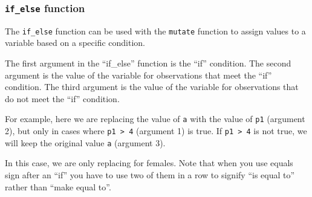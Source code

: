 \documentclass[]{book}
\newenvironment{Shaded}{\begin{snugshade}}{\end{snugshade}}
\newcommand{\DataTypeTok}[1]{\textcolor[rgb]{0.13,0.29,0.53}{#1}}
\newcommand{\DecValTok}[1]{\textcolor[rgb]{0.00,0.00,0.81}{#1}}
\newcommand{\KeywordTok}[1]{\textcolor[rgb]{0.13,0.29,0.53}{\textbf{#1}}}
\newcommand{\NormalTok}[1]{#1}
\newcommand{\OperatorTok}[1]{\textcolor[rgb]{0.81,0.36,0.00}{\textbf{#1}}}
\newcommand{\StringTok}[1]{\textcolor[rgb]{0.31,0.60,0.02}{#1}}
\begin{document}
\begin{Shaded}
\end{Shaded}

\hypertarget{if_else-function}{%
\subsubsection{\texorpdfstring{\texttt{if\_else} function}{if\_else function}}\label{if_else-function}}

The \texttt{if\_else} function can be used with the \texttt{mutate} function to assign values to a variable based on a specific condition.

The first argument in the ``if\_else'' function is the ``if'' condition. The second argument is the value of the variable for observations that meet the ``if'' condition. The third argument is the value of the variable for observations that do not meet the ``if'' condition.

For example, here we are replacing the value of \texttt{a} with the value of \texttt{p1} (argument 2), but only in cases where \texttt{p1\ \textgreater{}\ 4} (argument 1) is true. If \texttt{p1\ \textgreater{}\ 4} is not true, we will keep the original value \texttt{a} (argument 3).

\begin{Shaded}
\end{Shaded}

In this case, we are only replacing for females. Note that when you use equals sign after an ``if'' you have to use two of them in a row to signify ``is equal to'' rather than ``make equal to''.

\begin{Shaded}
\end{Shaded}
\end{document}
